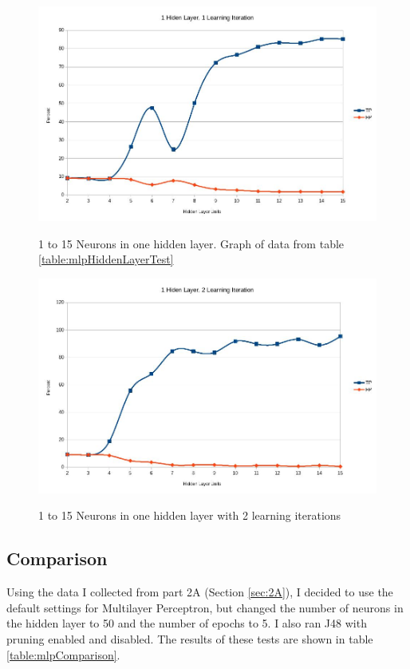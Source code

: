 \documentclass[10pt]{article}
\begin{document}
      \begin{figure}
        \centering
        \captionsetup{justification=centering}
          \caption{1 to 15 Neurons in one hidden layer. Graph of data from table \ref{table:mlpHiddenLayerTest}}
          \includegraphics[width=\textwidth]{ann-10-units-1-iteration.jpg}
        \label{fig:mlp10HiddenUnits}
      \end{figure}

      \begin{figure}
        \centering
        \captionsetup{justification=centering}
          \caption{1 to 15 Neurons in one hidden layer with 2 learning iterations}
          \includegraphics[width=\textwidth]{ann-10-units-2-iteration.jpg}
        \label{fig:mlp10HiddenUnits2Iterations}
      \end{figure}

    \subsection{Comparison}
      \label{sec:2B}
      Using the data I collected from part 2A (Section \ref{sec:2A}), I decided to use the default settings for Multilayer Perceptron, but changed the number of neurons in the hidden layer to 50 and the number of epochs to 5. I also ran J48 with pruning enabled and disabled. The results of these tests are shown in table \ref{table:mlpComparison}.
\end{document}

